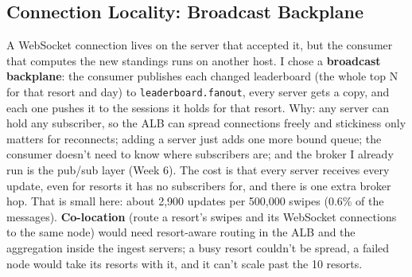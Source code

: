\documentclass[10pt]{article}
\begin{document}
\subsection{Connection Locality: Broadcast Backplane}
A WebSocket connection lives on the server that accepted it, but the consumer that computes the new standings runs on another host. I chose a \textbf{broadcast backplane}: the consumer publishes each changed leaderboard (the whole top N for that resort and day) to \texttt{leaderboard.fanout}, every server gets a copy, and each one pushes it to the sessions it holds for that resort. Why: any server can hold any subscriber, so the ALB can spread connections freely and stickiness only matters for reconnects; adding a server just adds one more bound queue; the consumer doesn't need to know where subscribers are; and the broker I already run is the pub/sub layer (Week 6). The cost is that every server receives every update, even for resorts it has no subscribers for, and there is one extra broker hop. That is small here: about 2,900 updates per 500,000 swipes (0.6\% of the messages). \textbf{Co-location} (route a resort's swipes and its WebSocket connections to the same node) would need resort-aware routing in the ALB and the aggregation inside the ingest servers; a busy resort couldn't be spread, a failed node would take its resorts with it, and it can't scale past the 10 resorts.
\end{document}

